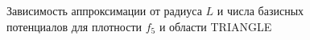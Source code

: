 \documentclass[a4paper, 12pt]{article}
\begin{document}
            \begin{figure}[h!]
              \noindent{}
              \caption{Зависимость аппроксимации от радиуса $L$ и числа базисных потенциалов для плотности $f_5$ и области TRIANGLE}
              \label{nolnol}
              \end{figure} 
\end{document}
